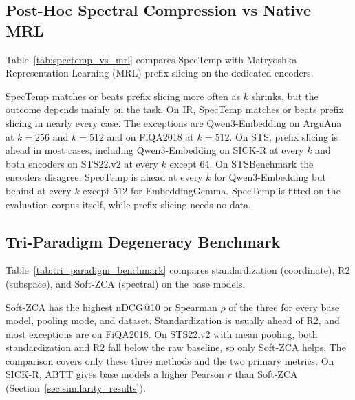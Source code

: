 \subsection{Post-Hoc Spectral Compression vs Native MRL}
Table~\ref{tab:spectemp_vs_mrl} compares SpecTemp with Matryoshka Representation Learning (MRL) prefix slicing on the dedicated encoders.

SpecTemp matches or beats prefix slicing more often as $k$ shrinks, but the outcome depends mainly on the task. On IR, SpecTemp matches or beats prefix slicing in nearly every case. The exceptions are Qwen3-Embedding on ArguAna at $k=256$ and $k=512$ and on FiQA2018 at $k=512$. On STS, prefix slicing is ahead in most cases, including Qwen3-Embedding on SICK-R at every $k$ and both encoders on STS22.v2 at every $k$ except 64. On STSBenchmark the encoders disagree: SpecTemp is ahead at every $k$ for Qwen3-Embedding but behind at every $k$ except 512 for EmbeddingGemma. SpecTemp is fitted on the evaluation corpus itself, while prefix slicing needs no data.

\subsection{Tri-Paradigm Degeneracy Benchmark}
Table~\ref{tab:tri_paradigm_benchmark} compares standardization (coordinate), R2 (subspace), and Soft-ZCA (spectral) on the base models.

Soft-ZCA has the highest nDCG@10 or Spearman $\rho$ of the three for every base model, pooling mode, and dataset. Standardization is usually ahead of R2, and most exceptions are on FiQA2018. On STS22.v2 with mean pooling, both standardization and R2 fall below the raw baseline, so only Soft-ZCA helps. The comparison covers only these three methods and the two primary metrics. On SICK-R, ABTT gives base models a higher Pearson $r$ than Soft-ZCA (Section~\ref{sec:similarity_results}).
